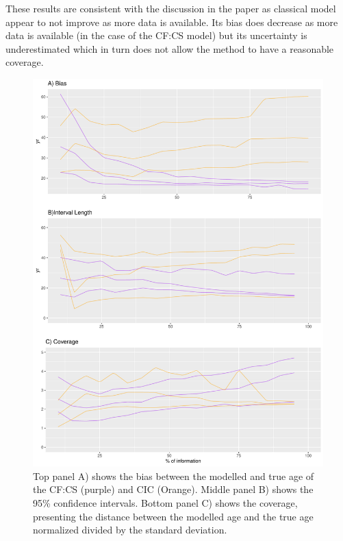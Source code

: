 \documentclass [10pt] {article}
\begin{document}
These results are consistent with the discussion in the paper as classical model appear to not improve as more data is available. Its bias does decrease as more data is available (in the case of the CF:CS model) but its uncertainty is underestimated which in turn does not allow the method to have a reasonable coverage. 


\begin{figure}
	\begin{centering}
		\includegraphics[width = 13cm]{AccPrec-appendix.pdf}
		\caption{ Top panel A) shows the bias between the modelled and true age of the CF:CS (purple) and CIC (Orange). Middle panel B) shows the 95\% confidence intervals. Bottom panel C) shows the coverage, presenting the distance between the modelled age and the true age normalized divided by the standard deviation. }
		\label{fig:CIC-CFCS}
	\end{centering}
\end{figure}
\end{document}
